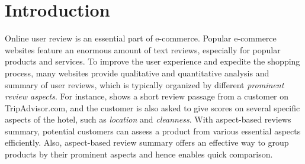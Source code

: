 \section{Introduction}
\label{sec:intro}
Online user review is an essential part of e-commerce. 
Popular e-commerce websites feature an enormous amount of text reviews, 
especially for popular products and services. 
To improve the user experience and expedite the
shopping process, many websites provide qualitative and quantitative
analysis and summary of user reviews, which is typically organized by different 
{\em prominent review aspects}.
For instance,  shows a short review passage from a customer on TripAdvisor.com, and the customer is also asked
to give scores on several specific aspects of the hotel, 
such as \textit{location} and \textit{cleanness}. 
%
With aspect-based reviews summary, potential customers can 
assess a product from various essential aspects efficiently.
Also, aspect-based review summary offers an effective 
way to group products by their prominent aspects and hence
enables quick comparison.

